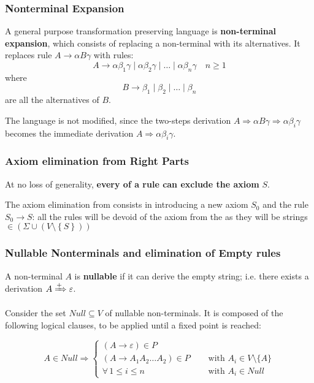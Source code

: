 \documentclass[english]{article}
\begin{document}
\subsubsection{Nonterminal Expansion}
\label{sec:non-terminal-expansion}

A general purpose transformation preserving language is \textbf{non-terminal expansion}, which consists of replacing a non-terminal with its alternatives.
It replaces rule \(A \rightarrow \alpha B \gamma\) with rules:
\[ A \rightarrow \alpha \beta_1 \gamma \mid \alpha \beta_2 \gamma \mid \ldots \mid \alpha \beta_n \gamma \quad n \geq 1 \]
where
\[ B \rightarrow \beta_1 \mid \beta_2 \mid \ldots \mid \beta_n \] are all the alternatives of \(B\).

The language is not modified, since the two-steps derivation \(A \Rightarrow \alpha B \gamma \Rightarrow \alpha \beta_i \gamma\) becomes the immediate derivation \(A \Rightarrow \alpha \beta_i \gamma\).

\subsubsection{Axiom elimination from Right Parts}
\label{sec:axiom-elimination-from-right-parts}

At no loss of generality, \textbf{every \RP of a rule can exclude the axiom} \(S\).

The axiom elimination from \RP consists in introducing a new axiom \(S_0\) and the rule \(S_0 \rightarrow S\):
all the rules will be devoid of the axiom from the \RP as they will be strings \(\in \left( \Sigma \cup \left( V \setminus \left\{ S \right\} \right) \right)\)

\subsubsection{Nullable Nonterminals and elimination of Empty rules}
\label{sec:nullable-non-terminals-and-elimination-of-empty-rules}

A non-terminal \(A\) is \textbf{nullable} if it can derive the empty string;
i.e. there exists a derivation \(A \xRightarrow{+} \varepsilon\).

Consider the set \(\textit{Null} \subseteq V\) of nullable non-terminals.
It is composed of the following logical clauses, to be applied until a fixed point is reached:

\[
  A \in \textit{Null} \Rightarrow
  \begin{cases}
    (A \rightarrow \varepsilon) \in P                                                        \\
    (A \rightarrow A_1 A_2 \ldots A_2) \in P \quad & \text{ with } A_i \in V \setminus \{A\} \\
    \forall \, 1 \leq i \leq n \quad               & \text{ with } A_i \in \textit{Null}
  \end{cases}
\]
\end{document}
